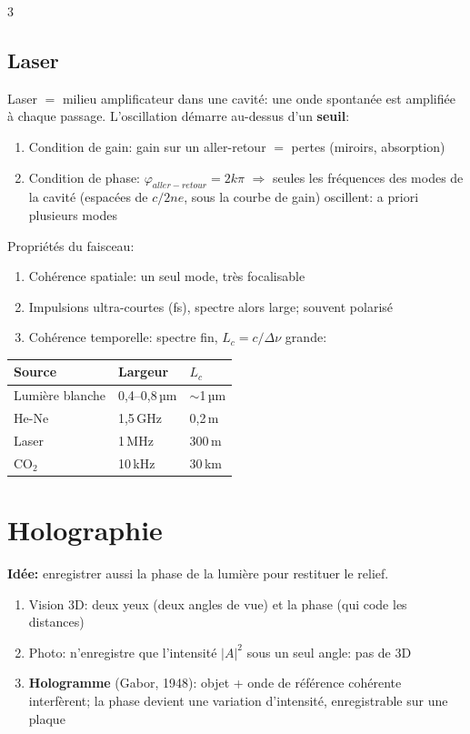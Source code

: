 \documentclass[12pt, a4paper]{article}
\begin{document}
\begin{multicols*}{3}
	\subsection{Laser}
	Laser $=$ milieu amplificateur dans une cavité: une onde spontanée est amplifiée à chaque passage. L'oscillation démarre au-dessus d'un \textbf{seuil}:
	\begin{enumerate}[\roman*.]
		\item Condition de gain: gain sur un aller-retour $=$ pertes (miroirs, absorption)
		\item Condition de phase: $\varphi_{aller-retour}=2k\pi$ $\Rightarrow$ seules les fréquences des modes de la cavité (espacées de $c/2ne$, sous la courbe de gain) oscillent: a priori plusieurs modes
	\end{enumerate}

	Propriétés du faisceau:
	\begin{enumerate}[\roman*.]
		\item Cohérence spatiale: un seul mode, très focalisable
		\item Impulsions ultra-courtes (fs), spectre alors large; souvent polarisé
		\item Cohérence temporelle: spectre fin, $L_c=c/\Delta\nu$ grande:
	\end{enumerate}
	\begin{tabular}{|l|l|l|}
		\hline
		\textbf{Source} & \textbf{Largeur} & $L_c$       \\
		\hline
		Lumière blanche & 0,4--0,8\,µm     & $\sim$1\,µm \\
		He-Ne           & 1,5\,GHz         & 0,2\,m      \\
		Laser           & 1\,MHz           & 300\,m      \\
		CO$_2$          & 10\,kHz          & 30\,km      \\
		\hline
	\end{tabular}

	\colbreak
	\section{Holographie}
	\textbf{Idée:} enregistrer aussi la phase de la lumière pour restituer le relief.
	\begin{enumerate}[\roman*.]
		\item Vision 3D: deux yeux (deux angles de vue) et la phase (qui code les distances)
		\item Photo: n'enregistre que l'intensité $|A|^2$ sous un seul angle: pas de 3D
		\item \textbf{Hologramme} (Gabor, 1948): objet + onde de référence cohérente interfèrent; la phase devient une variation d'intensité, enregistrable sur une plaque
	\end{enumerate}


\end{multicols*}
\end{document}
